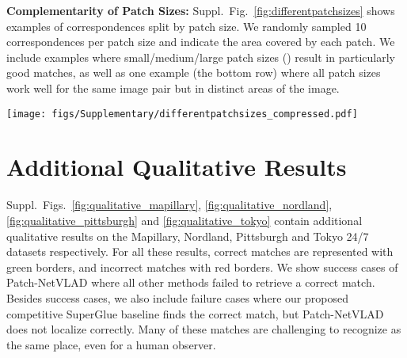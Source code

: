 \textbf{Complementarity of Patch Sizes:}
Suppl.~Fig.~\ref{fig:differentpatchsizes} shows examples of correspondences split by patch size. We randomly sampled 10 correspondences per patch size and indicate the area covered by each patch. We include examples where small/medium/large patch sizes (\ie ) result in particularly good matches, as well as one example (the bottom row) where all patch sizes work well for the same image pair but in distinct areas of the image.

\begin{figure*}[t!]
    \centering
    \texttt{[image: figs/Supplementary/differentpatchsizes\_compressed.pdf]}
    \caption{\textbf{Complementarity of Patch Sizes.} The three columns indicate different patch sizes, from small (\ie ) over medium (\ie ) to large (\ie ). It can be observed that a small patch size is able to find matches where smaller spatial context is more intuitive, for example, near boundaries between sky and buildings (first row, left column) or between sky and power lines (third row, left column). On the other hand, a larger patch size provides complementary cues by spanning over large building surfaces, enabling matching despite significant illumination variations (second row, right column). Note that the size of the squares does not reflect the receptive field sizes of the underlying features; different sizes are used for visualization purposes only.}
    \label{fig:differentpatchsizes}
\end{figure*}

\section{Additional Qualitative Results}
\label{sec:qualitative}
Suppl.~Figs.~\ref{fig:qualitative_mapillary}, \ref{fig:qualitative_nordland}, \ref{fig:qualitative_pittsburgh} and \ref{fig:qualitative_tokyo} contain additional qualitative results on the Mapillary, Nordland, Pittsburgh and Tokyo 24/7 datasets respectively. For all these results, correct matches are represented with green borders, and incorrect matches with red borders. We show success cases of Patch-NetVLAD where all other methods failed to retrieve a correct match. Besides success cases, we also include failure cases where our proposed competitive SuperGlue baseline finds the correct match, but Patch-NetVLAD does not localize correctly. Many of these matches are challenging to recognize as the same place, even for a human observer.

